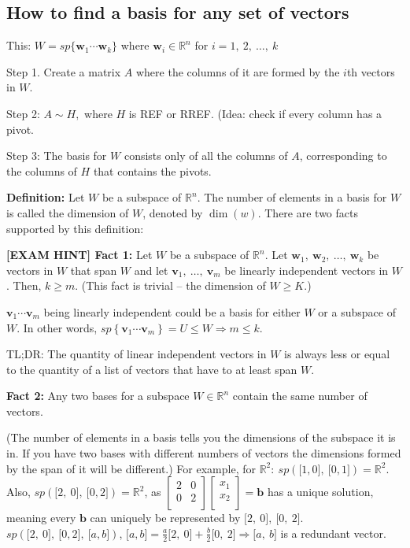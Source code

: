 \documentclass[
]{article}
\newcounter{example}
\begin{document}
\subsection{How to find a basis for any set of
vectors}

This: $W = sp\{{\mathbf{w}}_{1}\cdots{\mathbf{w}}_{k}\}$ where
${\mathbf{w}}_{i} \in \mathbb{R}^{n}$ for
$i = 1,\ 2,\ \ldots,\ k$

Step 1. Create a matrix $A$ where the columns of it are formed by the
$i$th vectors in $W$.

Step 2: $A\sim H,$ where $H$ is REF or RREF. (Idea: check if every
column has a pivot.

Step 3: The basis for $W$ consists only of all the columns of $A$,
corresponding to the columns of $H$ that contains the pivots.

\textbf{Definition:} Let $W$ be a subspace of $\mathbb{R}^{n}$. The
number of elements in a basis for $W$ is called the dimension of
$W$, denoted by $\dim(w)$. There are two facts supported by this
definition:

\textbf{{[}EXAM HINT{]} Fact 1:} Let $W$ be a subspace of
$\mathbb{R}^{n}$. Let
${\mathbf{w}}_{1},\ {\mathbf{w}}_{2},\ \ldots,\ {\mathbf{w}}_{k}$
be vectors in $W$ that span $W$ and let
${\mathbf{v}}_{1},\ \ldots,\ {\mathbf{v}}_{m}$ be linearly
independent vectors in $W$. Then, $k \geq m$. (This fact is trivial
-- the dimension of $W \geq K$.)

${\mathbf{v}}_{1}\cdots{\mathbf{v}}_{m}$ being linearly
independent could be a basis for either $W$ or a subspace of $W$. In
other words,
$sp\left\{ {\mathbf{v}}_{1}\cdots{\mathbf{v}}_{m} \right\} = U \leq W \Rightarrow m \leq k$.

TL;DR: The quantity of linear independent vectors in $W$ is always
less or equal to the quantity of a list of vectors that have to at least
span $W$.

\textbf{Fact 2:} Any two bases for a subspace $W \in \mathbb{R}^{n}$
contain the same number of vectors.

(The number of elements in a basis tells you the dimensions of the
subspace it is in. If you have two bases with different numbers of
vectors the dimensions formed by the span of it will be different.) For
example, for
$\mathbb{R}^{2}:\ sp\left( \lbrack 1,0\rbrack,\ \lbrack 0,1\rbrack \right) = \mathbb{R}^{2}$.
Also,
$sp\left( \lbrack 2,\ 0\rbrack,\ \lbrack 0,2\rbrack \right) = \mathbb{R}^{2}$,
as $\begin{bmatrix}
2 & 0 \\
0 & 2 \\
\end{bmatrix}\begin{bmatrix}
x_{1} \\
x_{2} \\
\end{bmatrix} = \mathbf{b}$ has a unique solution, meaning every
$\mathbf{b}$ can uniquely be represented by
$\lbrack 2,\ 0\rbrack,\ \lbrack 0,\ 2\rbrack$.
$sp\left( \lbrack 2,\ 0\rbrack,\ \lbrack 0,2\rbrack,\ \lbrack a,b\rbrack \right)$,
$\lbrack a,b\rbrack = \frac{a}{2}\lbrack 2,\ 0\rbrack + \frac{b}{2}\lbrack 0,\ 2\rbrack \Rightarrow \lbrack a,\ b\rbrack$
is a redundant vector.
\end{document}
